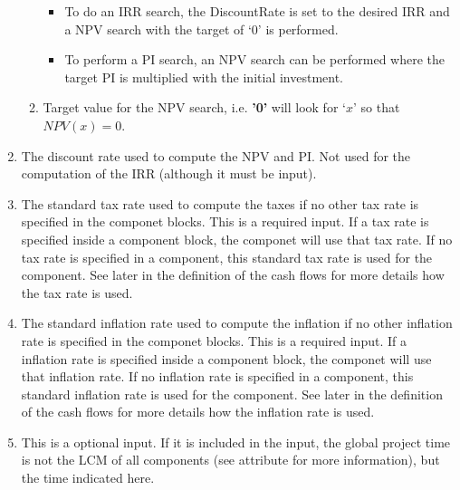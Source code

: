 \begin{enumerate}
\begin{enumerate}
  \begin{itemize}
  \item To do an IRR search, the DiscountRate is set to the desired IRR and a NPV search with the target of ‘0’ is performed.
  \item To perform a PI search, an NPV search can be performed where the target PI is multiplied with the initial investment.
  \end{itemize}


  \item[\xmlAttr{Target}] Target value for the NPV search, i.e. \textbf{'0'} will look for ‘$x$’ so that $NPV(x) = 0$.

  \end{enumerate}

\item[\xmlNode{DiscountRate}] The discount rate used to compute the NPV and PI. Not used for the computation of the IRR (although it must be input).
\item[\xmlNode{tax}] The standard tax rate used to compute the taxes if no other tax rate is specified in the componet blocks. This is a required input. If a tax rate is specified inside a component block, the componet will use that tax rate. If no tax rate is specified in a component, this standard tax rate is used for the component. See later in the definition of the cash flows for more details how the tax rate is used.
\item[\xmlNode{inflation}] The standard inflation rate used to compute the inflation if no other inflation rate is specified in the componet blocks. This is a required input. If a inflation rate is specified inside a component block, the componet will use that inflation rate. If no inflation rate is specified in a component, this standard inflation rate is used for the component. See later in the definition of the cash flows for more details how the inflation rate is used.

\item[\xmlNode{ProjectTime}] This is a optional input. If it is included in the input, the global project time is not the LCM of all components (see  attribute  for more information), but the time indicated here.

\end{enumerate}


\subsection{}

